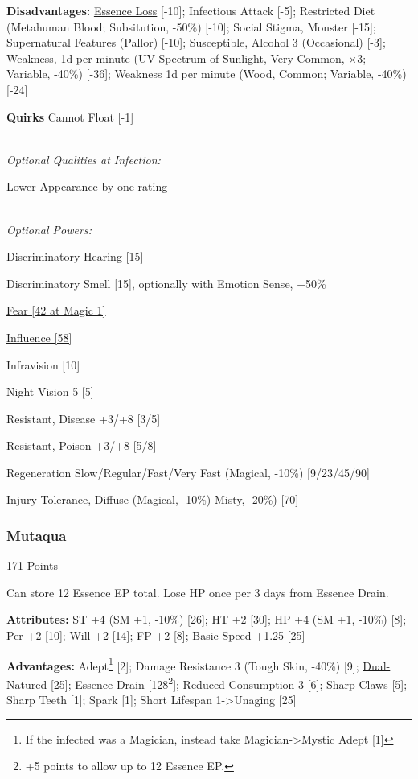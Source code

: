 \begin{multicols*}{3}
	\textbf{Disadvantages:}	
	\hyperref[essence_loss]{Essence Loss} [-10]; Infectious Attack [-5]; Restricted Diet (Metahuman Blood; Subsitution, -50\%) [-10]; Social Stigma, Monster [-15];  Supernatural Features (Pallor) [-10]; Susceptible, Alcohol 3 (Occasional) [-3]; Weakness, 1d per minute (UV Spectrum of Sunlight, Very Common, $\times$3; Variable, -40\%) [-36]; Weakness 1d per minute (Wood, Common; Variable, -40\%) [-24]
	
	\textbf{Quirks} 
	Cannot Float [-1]
	
	\textit{\\Optional Qualities at Infection:}
	
	Lower Appearance by one rating	
	
	\textit{\\Optional Powers:}
	
	Discriminatory Hearing [15]
	
	Discriminatory Smell [15], optionally with Emotion Sense, +50\%
	
	\hyperref[fear]{Fear [42 at Magic 1]}
	
	\hyperref[influence]{Influence [58]}
	
	Infravision [10]
	
	Night Vision 5 [5]
	
	Resistant, Disease +3/+8 [3/5]
	
	Resistant, Poison +3/+8 [5/8]
	
	Regeneration Slow/Regular/Fast/Very Fast (Magical, -10\%) [9/23/45/90]
	
	Injury Tolerance, Diffuse (Magical, -10\%) Misty, -20\%) [70]
	
	\subsubsection{Mutaqua}\label{mutaqua}
	\begin{flushright}
		171 Points
	\end{flushright}
	
	Can store 12 Essence EP total.
	Lose HP once per 3 days from Essence Drain.
		
	\textbf{Attributes:}
	ST +4 (SM +1, -10\%) [26]; HT +2 [30]; HP +4 (SM +1, -10\%) [8]; Per +2 [10]; Will +2 [14]; FP +2 [8]; Basic Speed +1.25 [25]
	
	\textbf{Advantages:}
	Adept\footnote{If the infected was a Magician, instead take Magician->Mystic Adept [1]} [2]; Damage Resistance 3 (Tough Skin, -40\%) [9]; \hyperref[dual_natured]{Dual-Natured} [25];  \hyperref[essence_drain]{Essence Drain} [128\footnote{+5 points to allow up to 12 Essence EP.}]; Reduced Consumption 3 [6]; Sharp Claws [5]; Sharp Teeth [1]; Spark [1]; Short Lifespan 1->Unaging [25]
	

\end{multicols*}
